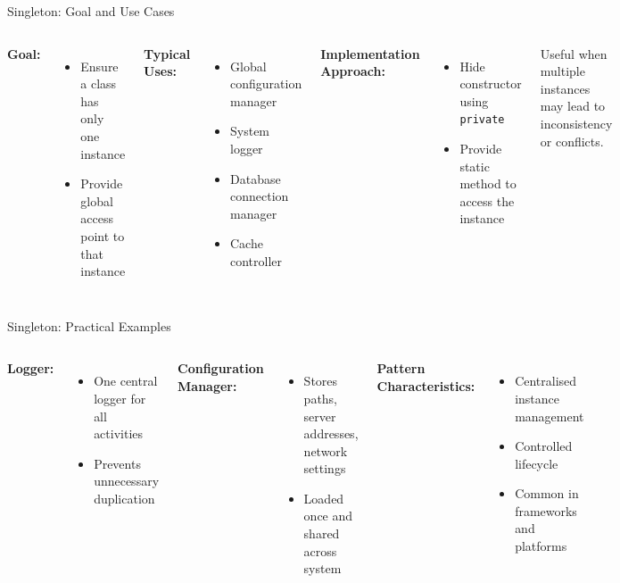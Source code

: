 \documentclass[aspectratio=169, table]{beamer}
\begin{document}
\begin{frame}[fragile]{Singleton: Goal and Use Cases}
\vspace{10pt}
\begin{columns}[T]
\textbf{Goal:}
\begin{itemize}
\item Ensure a class has only one instance
\item Provide global access point to that instance
\end{itemize}

\textbf{Typical Uses:}
\begin{itemize}
\item Global configuration manager
\item System logger
\item Database connection manager
\item Cache controller
\end{itemize}

\textbf{Implementation Approach:}
\begin{itemize}
\item Hide constructor using \texttt{private}
\item Provide static method to access the instance
\end{itemize}

\vspace{5pt}
Useful when multiple instances may lead to inconsistency or conflicts.
\end{columns}
\end{frame}

\begin{frame}[fragile]{Singleton: Practical Examples}
\vspace{10pt}
\begin{columns}[T]
\textbf{Logger:}
\begin{itemize}
\item One central logger for all activities
\item Prevents unnecessary duplication
\end{itemize}

\vspace{10pt}
\textbf{Configuration Manager:}
\begin{itemize}
\item Stores paths, server addresses, network settings
\item Loaded once and shared across system
\end{itemize}

\textbf{Pattern Characteristics:}
\begin{itemize}
\item Centralised instance management
\item Controlled lifecycle
\item Common in frameworks and platforms
\end{itemize}
\end{columns}
\end{frame}
\end{document}
